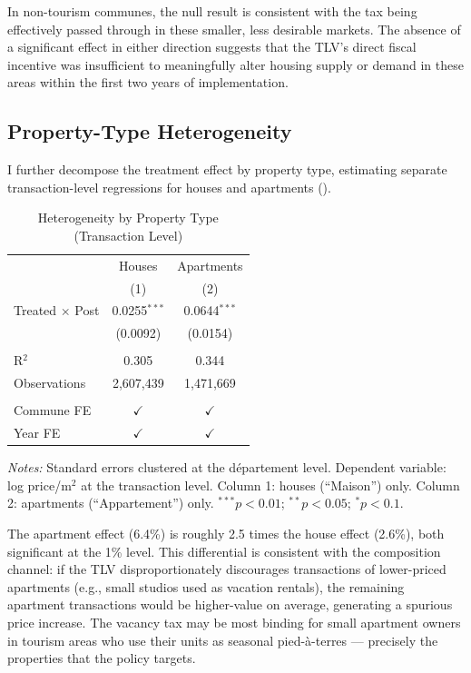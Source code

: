 \documentclass[12pt]{article}
\begin{document}
In non-tourism communes, the null result is consistent with the tax being effectively passed through in these smaller, less desirable markets. The absence of a significant effect in either direction suggests that the TLV's direct fiscal incentive was insufficient to meaningfully alter housing supply or demand in these areas within the first two years of implementation.

\subsection{Property-Type Heterogeneity}

I further decompose the treatment effect by property type, estimating separate transaction-level regressions for houses and apartments ().

\begin{table}[htbp]
    \centering
    \caption{Heterogeneity by Property Type (Transaction Level)}
    \label{tab:property_type}
    \begin{threeparttable}
    \begin{tabular}{lcc}
    \toprule
    & Houses & Apartments \\
    & (1) & (2) \\
    \midrule
    Treated $\times$ Post & 0.0255$^{***}$ & 0.0644$^{***}$ \\
    & (0.0092) & (0.0154) \\
    \\
    R$^2$ & 0.305 & 0.344 \\
    Observations & 2,607,439 & 1,471,669 \\
    \\
    Commune FE & $\checkmark$ & $\checkmark$ \\
    Year FE & $\checkmark$ & $\checkmark$ \\
    \bottomrule
    \end{tabular}
    \begin{tablenotes}[flushleft]\small
    \item \textit{Notes:} Standard errors clustered at the d\'epartement level. Dependent variable: log price/m$^2$ at the transaction level. Column 1: houses (``Maison'') only. Column 2: apartments (``Appartement'') only. $^{***}p<0.01$; $^{**}p<0.05$; $^{*}p<0.1$.
    \end{tablenotes}
    \end{threeparttable}
\end{table}

The apartment effect (6.4\%) is roughly 2.5 times the house effect (2.6\%), both significant at the 1\% level. This differential is consistent with the composition channel: if the TLV disproportionately discourages transactions of lower-priced apartments (e.g., small studios used as vacation rentals), the remaining apartment transactions would be higher-value on average, generating a spurious price increase. The vacancy tax may be most binding for small apartment owners in tourism areas who use their units as seasonal pied-\`a-terres --- precisely the properties that the policy targets.
\end{document}
